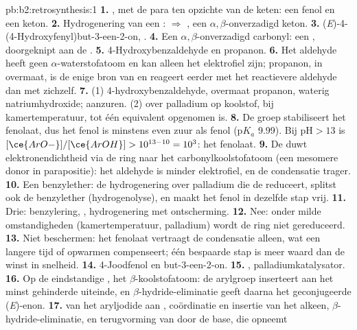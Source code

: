 \begin{solution}{pb:b2:retrosynthesis:1}
\textbf{1.} , met de  para ten opzichte van de keten: een fenol en een keton.
\textbf{2.} Hydrogenering van een :  $\Rightarrow$ , een
$\alpha,\beta$-onverzadigd keton.
\textbf{3.} (\textit{E})-4-(4-Hydroxyfenyl)but-3-een-2-on, .
\textbf{4.} Een $\alpha,\beta$-onverzadigd carbonyl: een , doorgeknipt aan de .
\textbf{5.} 4-Hydroxybenzaldehyde en propanon.
\textbf{6.} Het aldehyde heeft geen $\alpha$-waterstofatoom en kan alleen het elektrofiel zijn; propanon, in
overmaat, is de enige bron van  en reageert eerder met het reactievere aldehyde dan met zichzelf.
\textbf{7.} (1) 4-hydroxybenzaldehyde, overmaat propanon, waterig natriumhydroxide; aanzuren. (2)
 over palladium op koolstof, bij kamertemperatuur, tot één equivalent opgenomen is.
\textbf{8.} De groep  stabiliseert het fenolaat, dus het fenol is minstens even zuur als fenol
($\mathrm pK_a$ 9.99). Bij $\mathrm{pH} > 13$ is $[\ce{ArO-}]/[\ce{ArOH}] > 10^{13-10} = 10^3$: het
fenolaat.
\textbf{9.} De  duwt elektronendichtheid via de ring naar het carbonylkoolstofatoom (een
mesomere donor in parapositie): het aldehyde is minder elektrofiel, en de condensatie trager.
\textbf{10.} Een benzylether: de hydrogenering over palladium die de  reduceert, splitst ook
de benzylether (hydrogenolyse), en maakt het fenol in dezelfde stap vrij.
\textbf{11.} Drie: benzylering, , hydrogenering met ontscherming.
\textbf{12.} Nee: onder milde omstandigheden (kamertemperatuur, palladium) wordt de  ring niet gereduceerd.
\textbf{13.} Niet beschermen: het fenolaat vertraagt de condensatie alleen, wat een langere tijd of opwarmen
compenseert; één bespaarde stap is meer waard dan de winst in snelheid.
\textbf{14.} 4-Joodfenol en but-3-een-2-on.
\textbf{15.} , palladiumkatalysator.
\textbf{16.} Op de eindstandige , het $\beta$-koolstofatoom: de arylgroep inserteert aan het minst gehinderde
uiteinde, en $\beta$-hydride-eliminatie geeft daarna het geconjugeerde (\textit{E})-enon.
\textbf{17.}  van het aryljodide aan , coördinatie en insertie van het
alkeen, $\beta$-hydride-eliminatie, en terugvorming van  door de base, die  opneemt

\end{solution}
